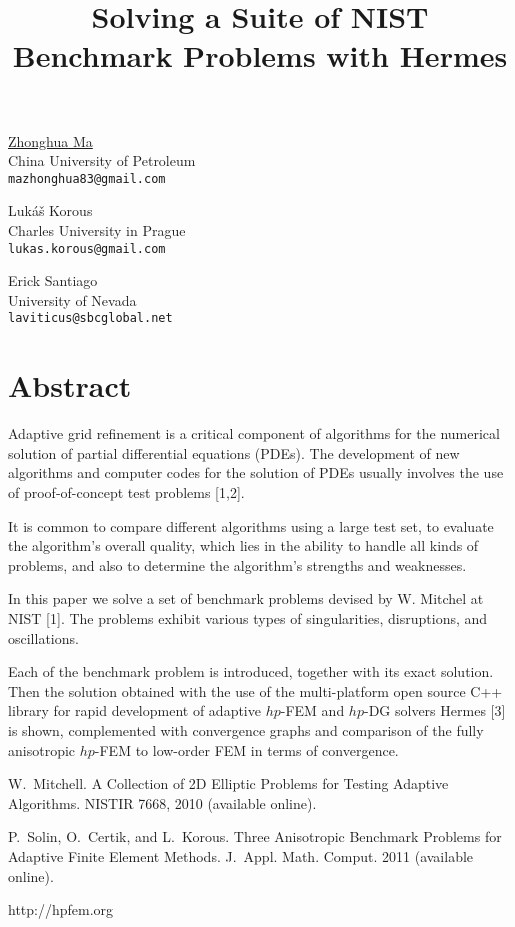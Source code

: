 \title{Solving a Suite of NIST Benchmark Problems with Hermes}
\author{} \institute{}
\maketitle

\begin{center}
{\large \underline{Zhonghua Ma}}\\
China University of Petroleum\\
{\tt mazhonghua83@gmail.com}\\
\vspace{4mm}

{\large Luk\'a\v s Korous}\\
Charles University in Prague\\
{\tt lukas.korous@gmail.com}\\
\vspace{4mm}

{\large Erick Santiago}\\
University of Nevada\\
{\tt laviticus@sbcglobal.net}
\end{center}

\section*{Abstract}
Adaptive grid refinement is a critical component of algorithms for the numerical solution of partial differential equations (PDEs). The development of new algorithms and computer codes for the solution of PDEs usually involves the use of proof-of-concept test problems [1,2].

It is common to compare different algorithms using a large test set, to evaluate the algorithm's overall quality, which lies in the ability to handle all kinds of problems, and also to determine the algorithm's strengths and weaknesses.

In this paper we solve a set of benchmark problems devised by W. Mitchel at NIST [1]. The problems exhibit various types of singularities, disruptions, and oscillations.

Each of the benchmark problem is introduced, together with its exact solution. Then the solution obtained with the use of the multi-platform open source C++ library for rapid development of adaptive $hp$-FEM and $hp$-DG solvers {\sc Hermes} [3] is shown, complemented with convergence graphs and comparison of the fully anisotropic $hp$-FEM to low-order FEM in terms of convergence.


\begin{thebibliography}{10}
{\sc W.~Mitchell}. {A Collection of 2D Elliptic Problems for Testing Adaptive Algorithms}. NISTIR 7668, 2010 (available online).

{\sc P.~Solin, O.~Certik, and L.~Korous}. {Three Anisotropic Benchmark Problems for Adaptive Finite Element Methods}. J.~Appl. Math. Comput. 2011 (available online).

{http://hpfem.org}
\end{thebibliography}
